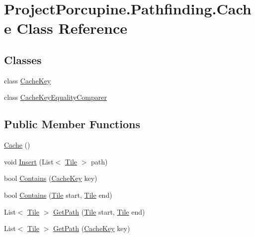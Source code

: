 \hypertarget{class_project_porcupine_1_1_pathfinding_1_1_cache}{}\section{Project\+Porcupine.\+Pathfinding.\+Cache Class Reference}
\label{class_project_porcupine_1_1_pathfinding_1_1_cache}
\subsection*{Classes}
\begin{DoxyCompactItemize}
\item 
class \hyperlink{class_project_porcupine_1_1_pathfinding_1_1_cache_1_1_cache_key}{Cache\+Key}
\item 
class \hyperlink{class_project_porcupine_1_1_pathfinding_1_1_cache_1_1_cache_key_equality_comparer}{Cache\+Key\+Equality\+Comparer}
\end{DoxyCompactItemize}
\subsection*{Public Member Functions}
\begin{DoxyCompactItemize}
\item 
\hyperlink{class_project_porcupine_1_1_pathfinding_1_1_cache_a6eea1c6f28fe23ec3067c7283fdadbfa}{Cache} ()
\item 
void \hyperlink{class_project_porcupine_1_1_pathfinding_1_1_cache_aaae72387671f323d735f007d47229cdd}{Insert} (List$<$ \hyperlink{class_tile}{Tile} $>$ path)
\item 
bool \hyperlink{class_project_porcupine_1_1_pathfinding_1_1_cache_a436c50b8874a554d71e5c86b6a96a882}{Contains} (\hyperlink{class_project_porcupine_1_1_pathfinding_1_1_cache_1_1_cache_key}{Cache\+Key} key)
\item 
bool \hyperlink{class_project_porcupine_1_1_pathfinding_1_1_cache_aa00cd71cb9920140c9c5f8835f557748}{Contains} (\hyperlink{class_tile}{Tile} start, \hyperlink{class_tile}{Tile} end)
\item 
List$<$ \hyperlink{class_tile}{Tile} $>$ \hyperlink{class_project_porcupine_1_1_pathfinding_1_1_cache_a4a0100e3b0839b0af0bc06d485562747}{Get\+Path} (\hyperlink{class_tile}{Tile} start, \hyperlink{class_tile}{Tile} end)
\item 
List$<$ \hyperlink{class_tile}{Tile} $>$ \hyperlink{class_project_porcupine_1_1_pathfinding_1_1_cache_a8841b12309dda8211809add9269da9dc}{Get\+Path} (\hyperlink{class_project_porcupine_1_1_pathfinding_1_1_cache_1_1_cache_key}{Cache\+Key} key)
\end{DoxyCompactItemize}


